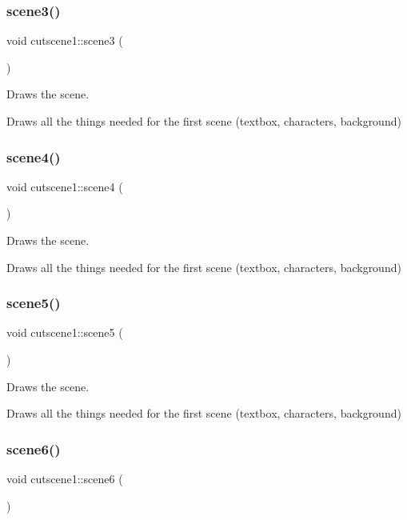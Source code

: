 \subsubsection{\texorpdfstring{scene3()}{scene3()}}
{\footnotesize\ttfamily void cutscene1\+::scene3 (\begin{DoxyParamCaption}{ }\end{DoxyParamCaption})}



Draws the scene. 

Draws all the things needed for the first scene (textbox, characters, background) \mbox{\label{classcutscene1_abbb516e182b20fe773d09419349ecbfe}} 
\subsubsection{\texorpdfstring{scene4()}{scene4()}}
{\footnotesize\ttfamily void cutscene1\+::scene4 (\begin{DoxyParamCaption}{ }\end{DoxyParamCaption})}



Draws the scene. 

Draws all the things needed for the first scene (textbox, characters, background) \mbox{\label{classcutscene1_ace82590104cccbecfd5ec0b4bacaca91}} 
\subsubsection{\texorpdfstring{scene5()}{scene5()}}
{\footnotesize\ttfamily void cutscene1\+::scene5 (\begin{DoxyParamCaption}{ }\end{DoxyParamCaption})}



Draws the scene. 

Draws all the things needed for the first scene (textbox, characters, background) \mbox{\label{classcutscene1_a2f30889d2d2d5126b99823bb81b167b3}} 
\subsubsection{\texorpdfstring{scene6()}{scene6()}}
{\footnotesize\ttfamily void cutscene1\+::scene6 (\begin{DoxyParamCaption}{ }\end{DoxyParamCaption})}



